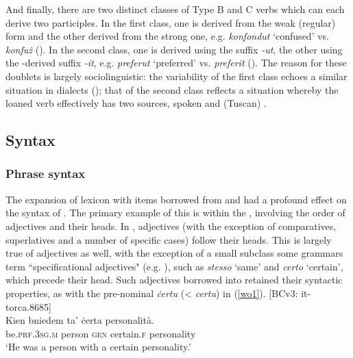 \documentclass[output=paper]{langsci/langscibook}
\begin{document}
And finally, there are two distinct classes of Type B and C verbs which can each derive two  participles. In the first class, one  is derived from the weak (regular) form  and the other derived from the strong one, e.g. \textit{konfondut} `confused' vs. \textit{konfuż} (\citealt[134]{mifsudloanverbs}). In the second class, one  is derived using the  suffix \textit{-ut}, the other using the -derived suffix \textit{-it}, e.g. \textit{preferut} `preferred' vs. \textit{preferit} (\citealt[230]{mifsudloanverbs}). The reason for these doublets is largely sociolinguistic: the variability of the first class echoes a similar situation in  dialects (\citealt[134]{mifsudloanverbs}); that of the second class reflects a situation whereby the loaned verb effectively has two sources, spoken  and  (Tuscan) .
\subsection{Syntax}
\subsubsection{Phrase syntax}
 \label{wo} %
The expansion of  lexicon with items borrowed from  and  had a profound effect on the syntax of . The primary example of this is  within the , involving the order of adjectives and their heads. In , adjectives (with the exception of comparatives, superlatives and a number of specific cases) follow their heads. This is largely true of  adjectives as well, with the exception of a small subclass some grammars term ``specificational adjectives" (e.g. \citealt[55--56]{italian2007}), such as \textit{stesso} `same' and \textit{certo} `certain', which precede their head. Such adjectives borrowed into  retained their syntactic properties, as with the pre-nominal \textit{ċertu} (<  \textit{certu}) in (\ref{wo1}).
\ea\label{wo1}
{[BCv3: it-torca.8685]} \\
	\gll Kien bniedem ta' ċerta personalità. \\
	be.\textsc{prf.3sg.m} person \textsc{gen} certain.\textsc{f} personality\\
	\glt `He was a person with a certain personality.'\\
\z
\end{document}
